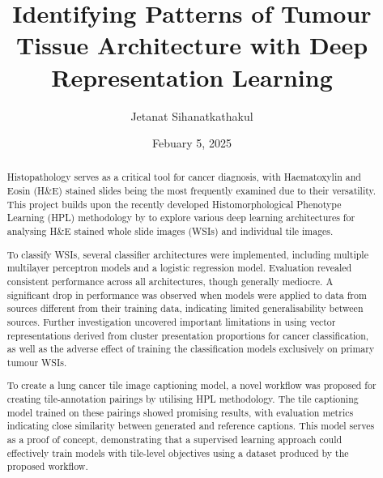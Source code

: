 \documentclass{l4proj}
\begin{document}
\title{Identifying Patterns of Tumour Tissue Architecture with Deep Representation Learning} %
\author{Jetanat Sihanatkathakul}
\date{Febuary 5, 2025}

\maketitle

\begin{abstract}
    Histopathology serves as a critical tool for cancer diagnosis, with Haematoxylin and Eosin (H\&E) stained slides being the most frequently examined due to their versatility. This project builds upon the recently developed Histomorphological Phenotype Learning (HPL) methodology by \cite{ClaudioQuiros2024} to explore various deep learning architectures for analysing H\&E stained whole slide images (WSIs) and individual tile images.
    
   To classify WSIs, several classifier architectures were implemented, including multiple multilayer perceptron models and a logistic regression model. Evaluation revealed consistent performance across all architectures, though generally mediocre. A significant drop in performance was observed when models were applied to data from sources different from their training data, indicating limited generalisability between sources. Further investigation uncovered important limitations in using vector representations derived from cluster presentation proportions for cancer classification, as well as the adverse effect of training the classification models exclusively on primary tumour WSIs. 
   
   To create a lung cancer tile image captioning model, a novel workflow was proposed for creating tile-annotation pairings by utilising HPL methodology. The tile captioning model trained on these pairings showed promising results, with evaluation metrics indicating close similarity between generated and reference captions. This model serves as a proof of concept, demonstrating that a supervised learning approach could effectively train models with tile-level objectives using a dataset produced by the proposed workflow.
\end{abstract}

\end{document}
